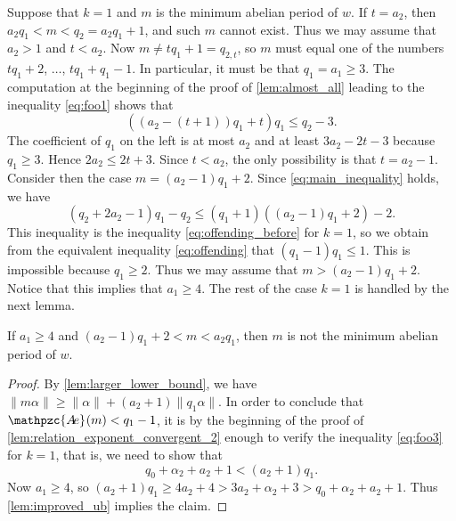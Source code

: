\documentclass[a4paper,fleqn]{article}
\providecommand{\norm}[1]{\lVert#1\rVert}
\newcommand{\abexp}[2][]{\mathpzc{A\mkern-3mu e}_{#1}(#2)}
\begin{document}
  Suppose that $k = 1$ and $m$ is the minimum abelian period of $w$. If $t = a_2$, then
  $a_2 q_1 < m < q_2 = a_2 q_1 + 1$, and such $m$ cannot exist. Thus we may assume that $a_2 > 1$ and $t < a_2$. Now
  $m \neq tq_1 + 1 = q_{2,t}$, so $m$ must equal one of the numbers $tq_1 + 2$, $\ldots$, $tq_1 + q_1 - 1$. In
  particular, it must be that $q_1 = a_1 \geq 3$. The computation at the beginning of the proof of
  \autoref{lem:almost_all} leading to the inequality \eqref{eq:foo1} shows that
  \begin{equation*}
    ((a_2 - (t + 1))q_1 + t)q_1 \leq q_2 - 3.
  \end{equation*}
  The coefficient of $q_1$ on the left is at most $a_2$ and at least $3a_2 - 2t - 3$ because $q_1 \geq 3$. Hence
  $2a_2 \leq 2t + 3$. Since $t < a_2$, the only possibility is that $t = a_2 - 1$. Consider then the case
  $m = (a_2 - 1)q_1 + 2$. Since \eqref{eq:main_inequality} holds, we have
  \begin{equation*}
    (q_2 + 2a_2 - 1)q_1 - q_2 \leq (q_1 + 1)( (a_2 - 1)q_1 + 2 ) - 2.
  \end{equation*}
  This inequality is the inequality \eqref{eq:offending_before} for $k = 1$, so we obtain from the equivalent
  inequality \eqref{eq:offending} that $(q_1 - 1)q_1 \leq 1$. This is impossible because $q_1 \geq 2$. Thus we may
  assume that $m > (a_2 - 1)q_1 + 2$. Notice that this implies that $a_1 \geq 4$. The rest of the case $k = 1$ is
  handled by the next lemma.

  \begin{lemma}\label{lem:case_1}
    If $a_1 \geq 4$ and $(a_2 - 1)q_1 + 2 < m < a_2 q_1$, then $m$ is not the minimum abelian period of $w$.
  \end{lemma}
  \begin{proof}
    By \autoref{lem:larger_lower_bound}, we have $\norm{m\alpha} \geq \norm{\alpha} + (a_2 + 1)\norm{q_1\alpha}$. In
    order to conclude that $\abexp{m} < q_1 - 1$, it is by the beginning of the proof of
    \autoref{lem:relation_exponent_convergent_2} enough to verify the inequality \eqref{eq:foo3} for $k = 1$, that is,
    we need to show that
    \begin{equation*}
      q_0 + \alpha_2 + a_2 + 1 < (a_2 + 1)q_1.
    \end{equation*}
    Now $a_1 \geq 4$, so $(a_2 + 1)q_1 \geq 4a_2 + 4 > 3a_2 + \alpha_2 + 3 > q_0 + \alpha_2 + a_2 + 1$. Thus
    \autoref{lem:improved_ub} implies the claim.
  \end{proof}
\end{document}
